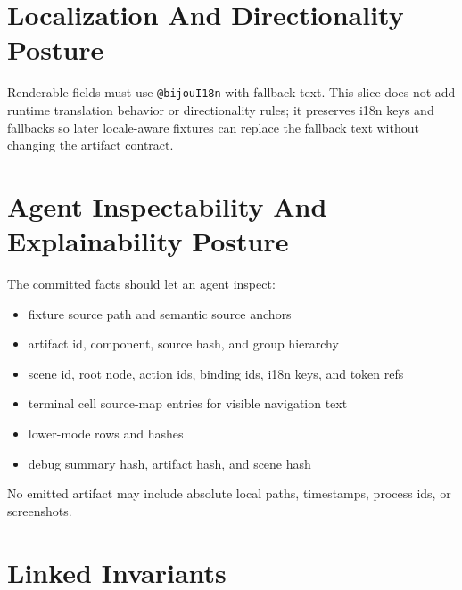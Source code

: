 \section{Localization And Directionality Posture}\label{record-142-localization-and-directionality-posture}

Renderable fields must use \texttt{@\allowbreak{}b\allowbreak{}i\allowbreak{}j\allowbreak{}o\allowbreak{}u\allowbreak{}I\allowbreak{}1\allowbreak{}8\allowbreak{}n} with fallback text. This slice does not add runtime translation behavior or directionality rules; it preserves i18n keys and fallbacks so later locale-aware fixtures can replace the fallback text without changing the artifact contract.

\section{Agent Inspectability And Explainability Posture}\label{record-142-agent-inspectability-and-explainability-posture}

The committed facts should let an agent inspect:

\begin{itemize}
\tightlist
\item
  fixture source path and semantic source anchors
\item
  artifact id, component, source hash, and group hierarchy
\item
  scene id, root node, action ids, binding ids, i18n keys, and token refs
\item
  terminal cell source-map entries for visible navigation text
\item
  lower-mode rows and hashes
\item
  debug summary hash, artifact hash, and scene hash
\end{itemize}

No emitted artifact may include absolute local paths, timestamps, process ids, or screenshots.

\section{Linked Invariants}\label{record-142-linked-invariants}

